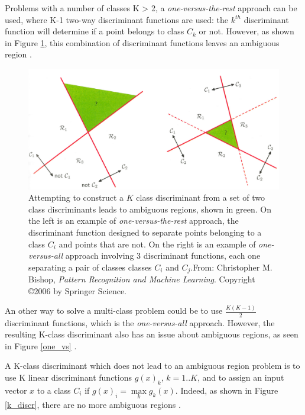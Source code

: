 \noindent Problems with a number of classes K > 2, a \textit{one-versus-the-rest} approach can be used, where K-1 two-way discriminant functions are used: the $k^{th}$ discriminant function will determine if a point belongs to class $C_k$ or not. However, as shown in Figure \ref{one_vs_rest}, this combination of discriminant functions leaves an ambiguous region \cite{BIS06}. 
\newline

\begin{figure}[!h]
\begin{center}
\noindent \includegraphics[scale=0.2]{figures/one_vs} 
\newline
\caption{Attempting to construct a $K$ class discriminant from a set of two class discriminants leads to ambiguous regions, shown in green. On the left is an example of \textit{one-versus-the-rest} approach, the discriminant function designed to separate points belonging to a class $C_i$ and points that are not. On the right is an example of \textit{one-versus-all} approach involving 3 discriminant functions, each one separating a pair of classes classes $C_i$ and $C_j$.From: Christopher M. Bishop, \textit{Pattern Recognition and Machine Learning}. Copyright \copyright  2006 by Springer Science.}
\label{one_vs_rest}
\end{center} 
\end{figure}

\noindent An other way to solve a multi-class problem could be to use $\frac{K(K-1)}{2}$ discriminant functions, which is the \textit{one-versus-all} approach. However, the resulting K-class discriminant also has an issue about ambiguous regions, as seen in Figure \ref{one_vs} \cite{BIS06}.
\newline

\noindent A K-class discriminant which does not lead to an ambiguous region problem is to use K linear discriminant functions $g(x)_k$, $k=1..K$, and to assign an input vector $x$ to a class $C_i$ if $g(x)_i = \max\limits_{k} g_k(x)$. Indeed, as shown in Figure \ref{k_discr}, there are no more ambiguous regions \cite{BIS06}.
\newline

